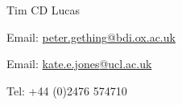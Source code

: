 \documentclass{scrartcl}
\begin{document}
\begin{cv}{Tim {\Large CD} Lucas}
\begin{multicols}{2}
\begin{footnotesize}
\end{footnotesize}
\end{multicols}
\vspace{-0.5cm}
\begin{multicols}{2}
\begin{footnotesize}

Email: \href{mailto:peter.gething@bdi.ox.ac.uk }{peter.gething{\scriptsize @}bdi.ox.ac.uk }\newline

\columnbreak

Email: \href{mailto:kate.e.jones@ucl.ac.uk}{kate.e.jones{\scriptsize @}ucl.ac.uk}\newline

Tel: +44 (0)2476 574710
\end{footnotesize}
\end{multicols}




\end{cv}
\end{document}
